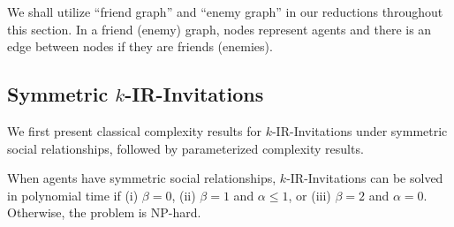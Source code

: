 We shall utilize ``friend graph'' and ``enemy graph'' in our reductions throughout this section. In a friend (enemy) graph, nodes represent agents and there is an edge between nodes if they are friends (enemies).

\subsection{Symmetric $k$-IR-Invitations}

We first present classical complexity results for $k$-IR-Invitations under symmetric social relationships, followed by parameterized complexity results. 


\begin{theorem} \label{SIP:thm:symmetric_IR_p_npc}
	When agents have symmetric social relationships, 
	$k$-IR-Invitations can be solved in polynomial time if (i) $\beta = 0$, (ii) $\beta = 1$ and $\alpha \leq 1$, or (iii) $\beta = 2$ and $\alpha = 0$. Otherwise, the problem is NP-hard. 
\end{theorem}
